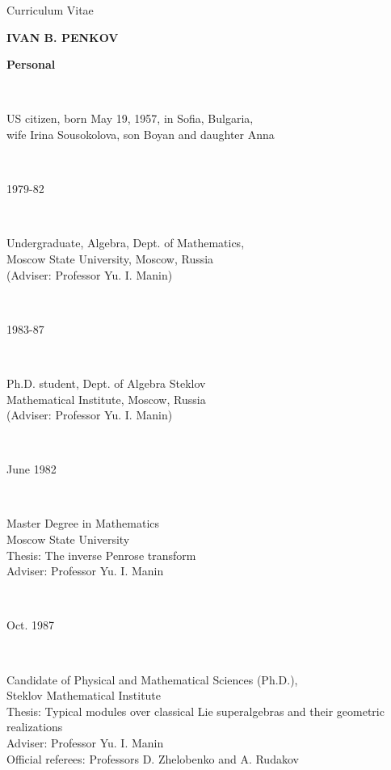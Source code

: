 
\textwidth=145mm
\newcommand{\thc}[2]{\noindent\parbox[t]{40mm}{#1}\
\parbox[t]{105mm}{#2}\\
}
\def\ls{\vskip.25in}
\def\ss{\vskip.10in}



\begin{center}
Curriculum Vitae

\medskip

{\large{\bf IVAN B. PENKOV}}
\end{center}

\bigskip

\thc{\bf Personal}{US citizen, born May 19, 1957, in Sofia,
Bulgaria,\\ wife Irina Sousokolova, son Boyan and daughter Anna}

\medskip


\medskip

\thc{1979-82}{Undergraduate, Algebra, Dept. of Mathematics,\\
Moscow State University, Moscow, Russia\\
(Adviser: Professor Yu. I. Manin)\\}
\thc{1983-87}{Ph.D. student, Dept. of Algebra
Steklov \\Mathematical Institute, Moscow, Russia\\
(Adviser: Professor Yu. I. Manin)}

\bigskip


\medskip

\thc{June 1982}{Master Degree in Mathematics\\
Moscow State University \\ Thesis:  The inverse Penrose
transform\\
Adviser:  Professor Yu. I. Manin\\}
\thc{Oct. 1987}{Candidate of Physical and Mathematical Sciences (Ph.D.),\\
Steklov Mathematical Institute\\
Thesis:  Typical modules over classical Lie superalgebras and their
geometric realizations\\
Adviser:  Professor Yu. I. Manin\\
Official referees:  Professors D. Zhelobenko and A. Rudakov}

\bigskip

